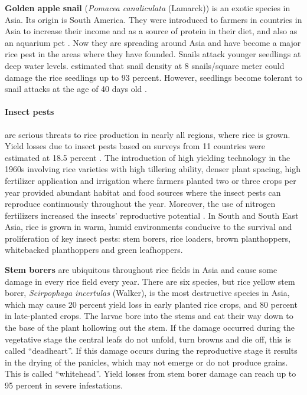 

\textbf{Golden apple snail} (\textit{Pomacea canaliculata} (Lamarck)) is an exotic species in Asia. Its origin is South America. They were introduced to farmers in countries in Asia to increase their income and as a source of protein in their diet, and also as an aquarium pet \citep{Joshi_2007_Problems}.  Now they are spreading around Asia and have become a major rice pest in the areas where they have founded. Snails attack younger seedlings at deep water levels. \citep{Basilio_1991_Problems} estimated that snail density at 8 snails/square meter could damage the rice seedlings up to 93 percent. However, seedlings become tolerant to snail attacks at the age of 40 days old \citep{Sin_2003_Damage}.  

\paragraph{Insect pests} are serious threats to rice production in nearly all regions, where rice is grown. Yield losses due to insect pests based on surveys from 11 countries were estimated at 18.5 percent \citep{Pathak_1994_Insect}.  The introduction of high yielding technology in the 1960s involving rice varieties with high tillering ability, denser plant spacing, high fertilizer application and irrigation where farmers planted two or three crops per year provided abundant habitat and food sources where the insect pests can reproduce continuously throughout the year. Moreover, the use of nitrogen fertilizers increased the insects' reproductive potential \citep{Bottrell_2012_Resurrecting}. In South and South East Asia, rice is grown in warm, humid environments conducive to the survival and proliferation of key insect pests: stem borers, rice loaders, brown planthoppers, whitebacked planthoppers and green leafhoppers.


\textbf{Stem borers} are ubiquitous throughout rice fields in Asia and cause some damage in every rice field every year. There are six species, but rice yellow stem borer, \textit{Scirpophaga incertulas} (Walker), is the most destructive species in Asia, which may cause 20 percent yield loss in early planted rice crops, and 80 percent in late-planted crops. The larvae bore into the stems and eat their way down to the base of the plant hollowing out the stem. If the damage occurred during the vegetative stage the central leafs do not unfold, turn browns and die off, this is called ``deadheart''. If this damage occurs during the reproductive stage it results in the drying of the panicles, which may not emerge or do not produce grains. This is called ``whitehead''. Yield losses from stem borer damage can reach up to 95 percent in severe infestations. 

